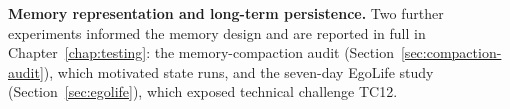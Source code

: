 \textbf{Memory representation and long-term persistence.} Two further
experiments informed the memory design and are reported in full in
Chapter~\ref{chap:testing}: the memory-compaction audit
(Section~\ref{sec:compaction-audit}), which motivated state runs, and the
seven-day EgoLife study (Section~\ref{sec:egolife}), which exposed technical
challenge TC12.
